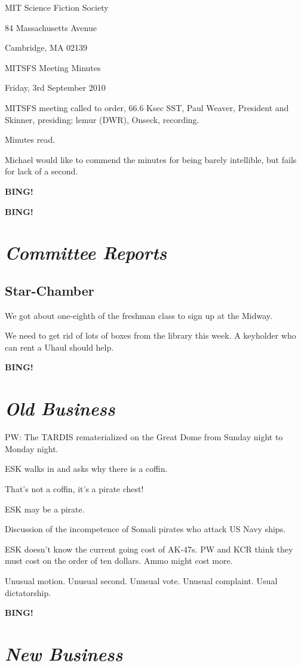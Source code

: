\documentclass[10pt]{article}
\newcommand{\bing}{{\bf BING!} }
\newcommand{\goto}[1]{\bing \vskip 12pt \section*{{\em{#1}}}}
\newcommand{\skinner}{Paul Weaver, President and Skinner}
\newcommand{\onseck}{lemur (DWR), Onseck}
\newcommand{\meetingdate}{Friday, 3rd September 2010}
\begin{document}
\begin{center}

MIT Science Fiction Society

84 Massachusetts Avenue

Cambridge, MA 02139

\vspace{12pt}

MITSFS Meeting Minutes

\meetingdate

\end{center}

\vspace{18pt}

\setlength{\parskip}{6pt}

\noindent
MITSFS meeting called to order, 66.6 Ksec SST,
\skinner, presiding; \onseck, recording.

Minutes read.

Michael would like to commend the minutes for being barely
intellible, but fails for lack of a second.

\bing

\goto{Committee Reports}

\subsection*{Star-Chamber}

We got about one-eighth of the freshman class to sign up at
the Midway.

We need to get rid of lots of boxes from the library this week.
A keyholder who can rent a Uhaul should help.

\goto{Old Business}

PW: The TARDIS rematerialized on the Great Dome from Sunday night
to Monday night.

ESK walks in and asks why there is a coffin.

That's not a coffin, it's a pirate chest!

ESK may be a pirate.

Discussion of the incompetence of Somali pirates who attack US Navy
ships.

ESK doesn't know the current going cost of AK-47s.  PW and KCR think
they must cost on the order of ten dollars.  Ammo might cost more.

Unusual motion.  Unusual second.  Unusual vote.  Unusual complaint.
Usual dictatorship.

\goto{New Business}
\end{document}
